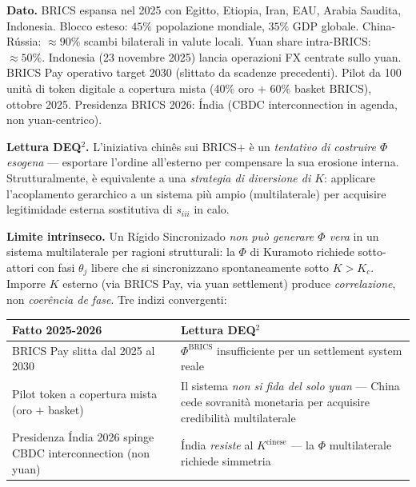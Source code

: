 \Proved{} \textbf{Dato.} BRICS espansa nel 2025 con Egitto, Etiopia,
Iran, EAU, Arabia Saudita, Indonesia. Blocco esteso: \(45\%\)
popolazione mondiale, \(35\%\) GDP globale. China-Rússia:
\(\approx 90\%\) scambi bilaterali in valute locali. Yuan share
intra-BRICS: \(\approx 50\%\). Indonesia (23 novembre 2025) lancia
operazioni FX centrate sullo yuan. BRICS Pay operativo target 2030
(slittato da scadenze precedenti). Pilot da 100 unità di token digitale
a copertura mista (40\% oro + 60\% basket BRICS), ottobre 2025.
Presidenza BRICS 2026: Índia (CBDC interconnection in agenda, non
yuan-centrico).

\Hypoth{} \textbf{Lettura DEQ$^2$.} L'iniziativa chinês sui BRICS+ è un
\emph{tentativo di costruire \(\Phi\) esogena} --- esportare l'ordine
all'esterno per compensare la sua erosione interna. Strutturalmente, è
equivalente a una \emph{strategia di diversione di \(K\)}: applicare
l'acoplamento gerarchico a un sistema più ampio (multilaterale) per
acquisire legitimidade esterna sostitutiva di \(s_{iii}\) in calo.

\Proved{} \textbf{Limite intrinseco.} Un Rígido Sincronizado \emph{non
può generare \(\Phi\) vera} in un sistema multilaterale per ragioni
strutturali: la \(\Phi\) di Kuramoto richiede sotto-attori con fasi
\(\theta_j\) libere che si sincronizzano spontaneamente sotto
\(K > K_c\). Imporre \(K\) esterno (via BRICS Pay, via yuan settlement)
produce \emph{correlazione}, non \emph{coerência de fase}. Tre indizi
convergenti:

{\def\LTcaptype{none} %
{\small\begin{longtable}[]{@{}
  >{\raggedright\arraybackslash}p{}
  >{\raggedright\arraybackslash}p{}@{}}
\toprule\noalign{}
\begin{minipage}[b]{\linewidth}\raggedright
Fatto 2025-2026
\end{minipage} & \begin{minipage}[b]{\linewidth}\raggedright
Lettura DEQ$^2$
\end{minipage} \\
\midrule\noalign{}
\endhead
\bottomrule\noalign{}
\endlastfoot
BRICS Pay slitta dal 2025 al 2030 & \(\Phi^{\text{BRICS}}\)
insufficiente per un settlement system reale \\
Pilot token a copertura mista (oro \(+\) basket) & Il sistema \emph{non
si fida del solo yuan} --- China cede sovranità monetaria per acquisire
credibilità multilaterale \\
Presidenza Índia 2026 spinge CBDC interconnection (non yuan) & Índia
\emph{resiste} al \(K^{\text{cinese}}\) --- la \(\Phi\) multilaterale
richiede simmetria \\
\end{longtable}}
}

